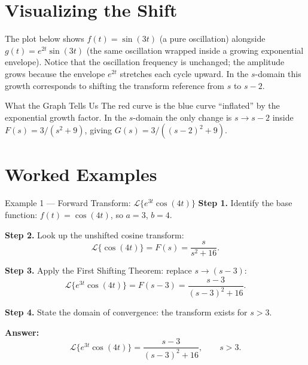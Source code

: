 \documentclass[12pt,a4paper]{article}
\begin{document}
\section{Visualizing the Shift}

The plot below shows $f(t) = \sin(3t)$ (a pure oscillation) alongside
$g(t) = e^{2t}\sin(3t)$ (the same oscillation wrapped inside a growing exponential envelope).
Notice that the oscillation frequency is unchanged; the amplitude grows because the envelope
$e^{2t}$ stretches each cycle upward.
In the $s$-domain this growth corresponds to shifting the transform reference from $s$ to $s-2$.

\begin{center}
\end{center}

\begin{learnbox}{What the Graph Tells Us}
The red curve is the blue curve ``inflated'' by the exponential growth factor.
In the $s$-domain the only change is $s \to s-2$ inside $F(s) = 3/(s^2+9)$,
giving $G(s) = 3/((s-2)^2+9)$.
\end{learnbox}

\section{Worked Examples}

\begin{infobox}{Example 1 --- Forward Transform: $\mathcal{L}\{e^{3t}\cos(4t)\}$}
\textbf{Step 1.} Identify the base function: $f(t) = \cos(4t)$, so $a = 3$, $b = 4$.

\textbf{Step 2.} Look up the unshifted cosine transform:
\[
  \mathcal{L}\{\cos(4t)\} = F(s) = \frac{s}{s^2 + 16}.
\]

\textbf{Step 3.} Apply the First Shifting Theorem: replace $s \to (s-3)$:
\[
  \mathcal{L}\{e^{3t}\cos(4t)\} = F(s-3) = \frac{s-3}{(s-3)^2 + 16}.
\]

\textbf{Step 4.} State the domain of convergence: the transform exists for $s > 3$.

\textbf{Answer:}
\[
  \mathcal{L}\{e^{3t}\cos(4t)\} = \frac{s-3}{(s-3)^2 + 16}, \qquad s > 3.
\]
\end{infobox}
\end{document}
